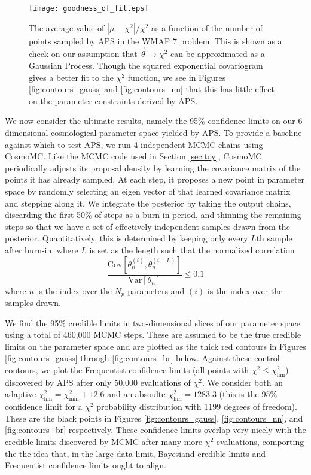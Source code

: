 \documentclass[useAMS,usenatbib]{aastex}
\begin{document}
\begin{figure}
\texttt{[image: goodness\_of\_fit.eps]}
\caption{
The average value of $|\mu-\chi^2|/\chi^2$ as a function of the number of points
sampled by APS in the WMAP 7 problem.  
This is shown as a check on our assumption that
$\vec{\theta}\rightarrow\chi^2$ can be approximated as a Gaussian Process.
Though the squared exponential covariogram gives a better fit to the $\chi^2$ function,
we see in Figures \ref{fig:contours_gauss} and \ref{fig:contours_nn}
that this has little effect on the parameter constraints derived by APS.
}
\label{fig:goodness}
\end{figure}

We now consider the ultimate results, namely the 95\% confidence limits on
our 6-dimensional cosmological parameter space yielded by APS.
To provide a baseline against which to test APS, we run 4 independent MCMC
chains using CosmoMC.  Like the MCMC code used in Section \ref{sec:toy},
CosmoMC periodically adjusts its proposal density by learning the covariance
matrix of the points it has already sampled.  At each step, it proposes
a new point in parameter space by randomly selecting an eigen vector
of that learned covariance matrix and stepping along it.
We integrate the posterior by taking the output chains, discarding the first
50\% of steps as a burn in period, and thinning the remaining steps so that
we have a set of effectively independent samples drawn from the posterior.
Quantitatively, this is determined by keeping only every $L$th sample after
burn-in, where $L$ is set as the length such that the normalized correlation
\begin{equation}
\frac{\text{Cov}[\theta_n^{(i)},\theta_n^{(i+L)}]}
{\text{Var}[\theta_n]}\le 0.1
\end{equation}
where $n$ is the index over the $N_p$ parameters and $(i)$ is the index
over the samples drawn.

We find the 95\% credible
limits in two-dimensional slices of our parameter space using
a total of 460,000 MCMC steps.  These are assumed to be the
true credible limits on the parameter space and are plotted
as the thick red
contours in Figures \ref{fig:contours_gauss} through 
\ref{fig:contours_br} 
below.  Against these control contours, we plot the Frequentist
confidence limits (all points with $\chi^2\le\chi^2_\text{lim}$)
discovered by APS after only 50,000 evaluations of $\chi^2$.
We consider both an adaptive $\chi^2_\text{lim}=\chi^2_\text{min}+12.6$
and an absoulte $\chi^2_\text{lim}=1283.3$ (this is the 95\% confidence limit
for a $\chi^2$ probability distribution with 1199 degrees of freedom).
These are the black points in Figures \ref{fig:contours_gauss}, \ref{fig:contours_nn},
and \ref{fig:contours_br} respectively.  These confidence limits overlap very nicely
with the credible limits discovered by MCMC after many more $\chi^2$ evaluations,
comporting the the idea that, in the large data limit, Bayesiand credible limits
and Frequentist confidence limits ought to align.
\end{document}
